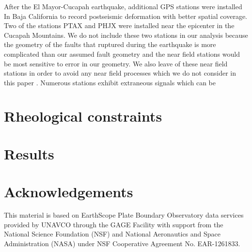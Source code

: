 \documentclass[12pt]{article}
\begin{document}
After the El Mayor-Cucapah earthquake, additional GPS stations were installed In Baja California to record postseismic deformation with better spatial coverage.  Two of the stations PTAX and PHJX were installed near the epicenter in the Cucapah Mountains.  We do not include these two stations in our analysis because the geometry of the faults that ruptured during the earthquake is more complicated than our assumed fault geometry \cite{Oskin2012} \cite{Fletcher2014} and the near field stations would be most sensitive to error in our geometry. We also leave of these near field stations in order to avoid any near field processes which we do not consider in this paper \cite{Gonzalez-ortega2014}. Numerous stations exhibit extraneous signals which can be 

\section*{Rheological constraints}

\section*{Results}
\section*{Acknowledgements}

This material is based on EarthScope Plate Boundary Observatory data services provided by UNAVCO through the GAGE Facility with support from the National Science Foundation (NSF) and National Aeronautics and Space Administration (NASA) under NSF Cooperative Agreement No. EAR-1261833.



\end{document}
